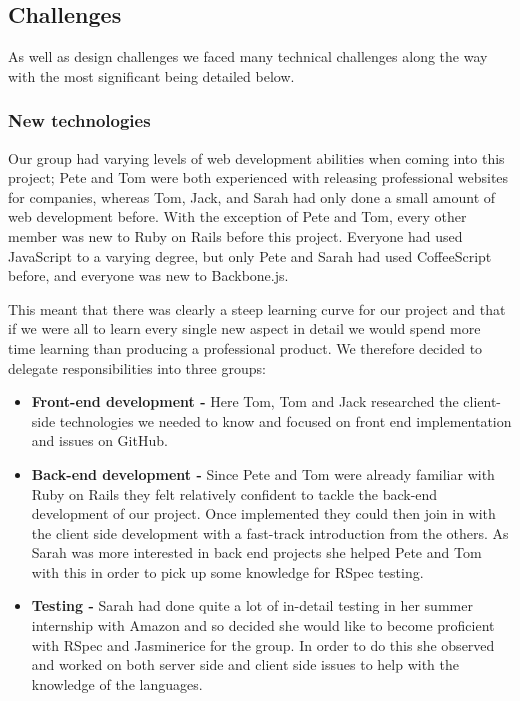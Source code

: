 \subsection{Challenges}
As well as design challenges we faced many technical challenges along the way with the most significant being detailed below.
  \subsubsection{New technologies}
    Our group had varying levels of web development abilities when coming into this project; Pete and Tom were both experienced with releasing professional websites for companies, whereas Tom, Jack, and Sarah had only done a small amount of web development before.
    With the exception of Pete and Tom, every other member was new to Ruby on Rails before this project. Everyone had used JavaScript to a varying degree, but only Pete and Sarah had used CoffeeScript before, and everyone was new to Backbone.js.

    This meant that there was clearly a steep learning curve for our project and that if we were all to learn every single new aspect in detail we would spend more time learning than producing a professional product.
    We therefore decided to delegate responsibilities into three groups:
    \begin{itemize}
      \item \textbf{Front-end development -} Here Tom, Tom and Jack researched the client-side technologies we needed to know and focused on front end implementation and issues on GitHub.
      \item \textbf{Back-end development -} Since Pete and Tom were already familiar with Ruby on Rails they felt relatively confident to tackle the back-end development of our project. Once implemented they could then join in with the client side development with a fast-track introduction from the others. As Sarah was more interested in back end projects she helped Pete and Tom with this in order to pick up some knowledge for RSpec testing.
      \item \textbf{Testing -} Sarah had done quite a lot of in-detail testing in her summer internship with Amazon and so decided she would like to become proficient with RSpec and Jasminerice for the group. In order to do this she observed and worked on both server side and client side issues to help with the knowledge of the languages.
    \end{itemize}

